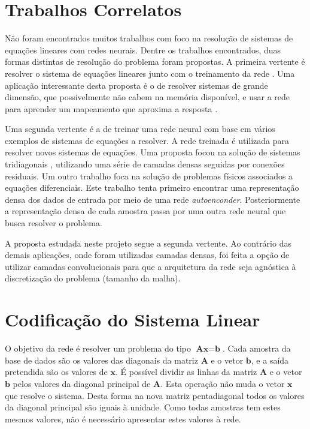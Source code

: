 \documentclass[final,5p]{elsarticle}
\numberwithin{equation}{section}
\begin{document}
\section{Trabalhos Correlatos}

    Não foram encontrados muitos trabalhos com foco na resolução de sistemas de equações lineares com redes neurais. Dentre os trabalhos encontrados, duas formas distintas de resolução do problema foram propostas. A primeira vertente é resolver o sistema de equações lineares junto com o treinamento da rede \cite{cichocki1992neural}. Uma aplicação interessante desta proposta é o de resolver sistemas de grande dimensão, que possivelmente não cabem na memória disponível, e usar a rede para aprender um mapeamento que aproxima a resposta \cite{gu2023deep}.

    Uma segunda vertente é a de treinar uma rede neural com base em vários exemplos de sistemas de equações a resolver. A rede treinada é utilizada para resolver novos sistemas de equações. Uma proposta focou na solução de sistemas tridiagonais \cite{jiang2023neural}, utilizando uma série de camadas densas seguidas por conexões residuais. Um outro trabalho \cite{kontolati2024learning} foca na solução de problemas físicos associados a equações diferenciais. Este trabalho tenta primeiro encontrar uma representação densa dos dados de entrada por meio de uma rede \emph{autoenconder}. Posteriormente a representação densa de cada amostra passa por uma outra rede neural que busca resolver o problema.

    A proposta estudada neste projeto segue a segunda vertente. Ao contrário das demais aplicações, onde foram utilizadas camadas densas, foi feita a opção de utilizar camadas convolucionais para que a arquitetura da rede seja agnóstica à discretização do problema (tamanho da malha).

\section{Codificação do Sistema Linear}

    O objetivo da rede é resolver um problema do tipo $\textbf{Ax}=\textbf{b}$. Cada amostra da base de dados são os valores das diagonais da matriz $\textbf{A}$ e o vetor $\textbf{b}$, e a saída pretendida são os valores de $\textbf{x}$. É possível dividir as linhas da matriz $\textbf{A}$ e o vetor $\textbf{b}$ pelos valores da diagonal principal de $\textbf{A}$. Esta operação não muda o vetor $\textbf{x}$ que resolve o sistema. Desta forma na nova matriz pentadiagonal todos os valores da diagonal principal são iguais à unidade. Como todas amostras tem estes mesmos valores, não é necessário apresentar estes valores à rede.
\end{document}
